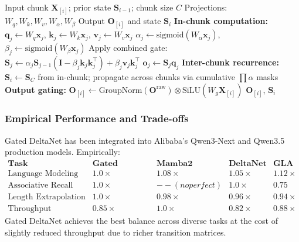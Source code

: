 \documentclass[11pt,a4paper]{article}
\begin{document}
\begin{algorithm}[H]
\caption{Gated DeltaNet Parallel Chunkwise Forward}
\begin{algorithmic}[1]
\Require Input chunk  $\mathbf{X}_{[i]}$; prior state $\mathbf{S}_{i-1}$; chunk size $C$
\Require Projections: $W_q, W_k, W_v, W_\alpha, W_\beta$
\Ensure Output $\mathbf{O}_{[i]}$ and state $\mathbf{S}_i$
\State \textbf{In-chunk computation:}
    \State $\mathbf{q}_j \gets W_q \mathbf{x}_j$, $\mathbf{k}_j \gets W_k \mathbf{x}_j$, $\mathbf{v}_j \gets W_v \mathbf{x}_j$
    \State $\alpha_j \gets \text{sigmoid}(W_\alpha \mathbf{x}_j)$, $\beta_j \gets \text{sigmoid}(W_\beta \mathbf{x}_j)$
    \State Apply combined gate: $\mathbf{S}_j \gets \alpha_j \mathbf{S}_{j-1}(\mathbf{I} - \beta_j \mathbf{k}_j \mathbf{k}_j^\top) + \beta_j \mathbf{v}_j \mathbf{k}_j^\top$
    \State $\mathbf{o}_j \gets \mathbf{S}_j \mathbf{q}_j$
\EndFor
\State \textbf{Inter-chunk recurrence:}
\State $\mathbf{S}_i \gets \mathbf{S}_C$ from in-chunk; propagate across chunks via cumulative $\prod \alpha$ masks
\State \textbf{Output gating:} $\mathbf{O}_{[i]} \gets \text{GroupNorm}(\mathbf{O}^\text{raw}) \otimes \text{SiLU}(W_g \mathbf{X}_{[i]})$
\Return $\mathbf{O}_{[i]}$, $\mathbf{S}_i$
\end{algorithmic}
\end{algorithm}

\subsubsection{Empirical Performance and Trade-offs}

Gated DeltaNet has been integrated into Alibaba's Qwen3-Next and Qwen3.5 production models. Empirically:
\[
\begin{array}{l|cccc}
\textbf{Task} & \textbf{Gated DeltaNet} & \textbf{Mamba2} & \textbf{DeltaNet} & \textbf{GLA} \\
\hline
\text{Language Modeling} & \mathbf{1.0\times} & 1.08\times & 1.05\times & 1.12\times \\
\text{Associative Recall} & \mathbf{1.0\times} & --(no perfect) & \mathbf{1.0\times} & 0.75 \\
\text{Length Extrapolation} & \mathbf{1.0\times} & 0.98\times & 0.96\times & 0.94\times \\
\text{Throughput (tokens/sec)} & 0.85\times & \mathbf{1.0\times} & 0.82\times & 0.88\times
\end{array}
\]
Gated DeltaNet achieves the best balance across diverse tasks at the cost of slightly reduced throughput due to richer transition matrices.
\end{document}
